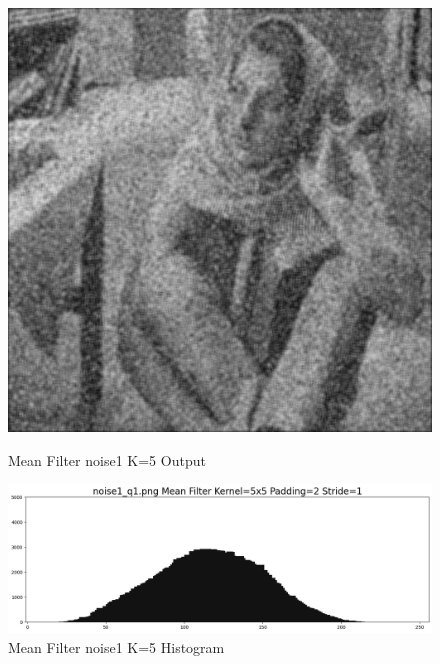 \documentclass[12pt,a4paper]{report}
\begin{document}
\begin{figure}[!htb]
  \includegraphics[width=1\linewidth]{output/noise1_q1_K5P2.png}
  \caption{Mean Filter noise1 K=5 Output}
  \includegraphics[width=1\linewidth]{output/noise1_q1_K5P2_his.png}
  \caption{Mean Filter noise1 K=5 Histogram}
\end{figure}
\end{document}
